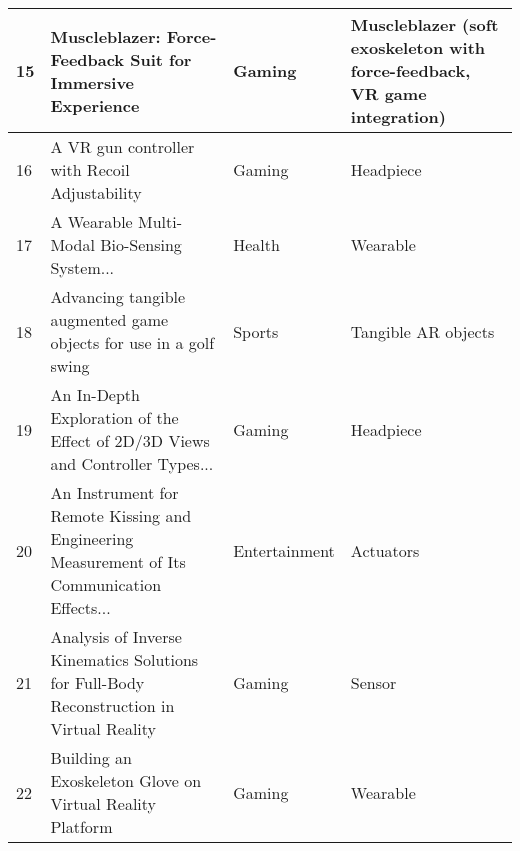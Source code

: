 \begin{landscape}
\begin{table}[]
{\begin{tabular}{|l|l|l|l|}
				15                               & Muscleblazer: Force-Feedback Suit for Immersive Experience                                                                                & Gaming                                   & Muscleblazer (soft exoskeleton with force-feedback, VR game integration)    \\ \hline
				16                               & A VR gun controller with Recoil Adjustability                                                                                             & Gaming                                   & Headpiece                                                                   \\ \hline
				17                               & A Wearable Multi-Modal Bio-Sensing System...                                                                                              & Health                                   & Wearable                                                                    \\ \hline
				18                               & Advancing tangible augmented game objects for use in a golf swing                                                                         & Sports                                   & Tangible AR objects                                                         \\ \hline
				19                               & An In-Depth Exploration of the Effect of 2D/3D Views and Controller Types...                                                              & Gaming                                   & Headpiece                                                                   \\ \hline
				20                               & An Instrument for Remote Kissing and Engineering Measurement of Its Communication Effects...                                              & Entertainment                            & Actuators                                                                   \\ \hline
				21                               & Analysis of Inverse Kinematics Solutions for Full-Body Reconstruction in Virtual Reality                                                  & Gaming                                   & Sensor                                                                      \\ \hline
				22                               & Building an Exoskeleton Glove on Virtual Reality Platform                                                                                 & Gaming                                   & Wearable                                                                    \\ \hline

\end{tabular}}
\end{table}
\end{landscape}
